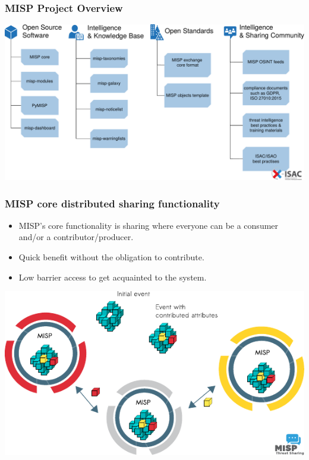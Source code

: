 \begin{frame}
        \frametitle{MISP Project Overview}
        \includegraphics[scale=0.42]{misp-overview-simplified.pdf}\\
\end{frame}


\begin{frame}
\frametitle{MISP core distributed sharing functionality}
\begin{itemize}
\item MISP's core functionality is sharing where everyone can be a consumer and/or a contributor/producer.
\item Quick benefit without the obligation to contribute.
\item Low barrier access to get acquainted to the system.
\end{itemize}
\includegraphics[scale=0.9]{misp-distributed.pdf}
\end{frame}

